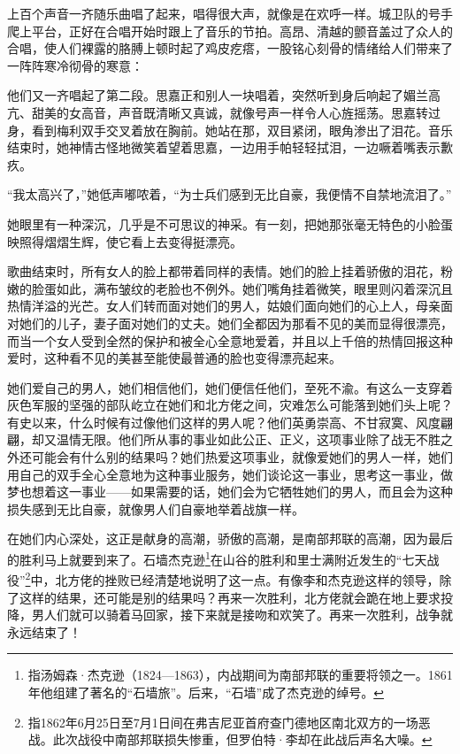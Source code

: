 \par 上百个声音一齐随乐曲唱了起来，唱得很大声，就像是在欢呼一样。城卫队的号手爬上平台，正好在合唱开始时跟上了音乐的节拍。高昂、清越的颤音盖过了众人的合唱，使人们裸露的胳膊上顿时起了鸡皮疙瘩，一股铭心刻骨的情绪给人们带来了一阵阵寒冷彻骨的寒意：
\par 他们又一齐唱起了第二段。思嘉正和别人一块唱着，突然听到身后响起了媚兰高亢、甜美的女高音，声音既清晰又真诚，就像号声一样令人心旌摇荡。思嘉转过身，看到梅利双手交叉着放在胸前。她站在那，双目紧闭，眼角渗出了泪花。音乐结束时，她神情古怪地微笑着望着思嘉，一边用手帕轻轻拭泪，一边噘着嘴表示歉疚。
\par “我太高兴了，”她低声嘟哝着，“为士兵们感到无比自豪，我便情不自禁地流泪了。”
\par 她眼里有一种深沉，几乎是不可思议的神采。有一刻，把她那张毫无特色的小脸蛋映照得熠熠生辉，使它看上去变得挺漂亮。
\par 歌曲结束时，所有女人的脸上都带着同样的表情。她们的脸上挂着骄傲的泪花，粉嫩的脸蛋如此，满布皱纹的老脸也不例外。她们嘴角挂着微笑，眼里则闪着深沉且热情洋溢的光芒。女人们转而面对她们的男人，姑娘们面向她们的心上人，母亲面对她们的儿子，妻子面对她们的丈夫。她们全都因为那看不见的美而显得很漂亮，而当一个女人受到全然的保护和被全心全意地爱着，并且以上千倍的热情回报这种爱时，这种看不见的美甚至能使最普通的脸也变得漂亮起来。
\par 她们爱自己的男人，她们相信他们，她们便信任他们，至死不渝。有这么一支穿着灰色军服的坚强的部队屹立在她们和北方佬之间，灾难怎么可能落到她们头上呢？有史以来，什么时候有过像他们这样的男人呢？他们英勇崇高、不甘寂寞、风度翩翩，却又温情无限。他们所从事的事业如此公正、正义，这项事业除了战无不胜之外还可能会有什么别的结果吗？她们热爱这项事业，就像爱她们的男人一样，她们用自己的双手全心全意地为这种事业服务，她们谈论这一事业，思考这一事业，做梦也想着这一事业——如果需要的话，她们会为它牺牲她们的男人，而且会为这种损失感到无比自豪，就像男人们自豪地举着战旗一样。
\par 在她们内心深处，这正是献身的高潮，骄傲的高潮，是南部邦联的高潮，因为最后的胜利马上就要到来了。石墙杰克逊\footnote{指汤姆森·杰克逊（1824—1863），内战期间为南部邦联的重要将领之一。1861年他组建了著名的“石墙旅”。后来，“石墙”成了杰克逊的绰号。}在山谷的胜利和里士满附近发生的“七天战役”\footnote{指1862年6月25日至7月1日间在弗吉尼亚首府查门德地区南北双方的一场恶战。此次战役中南部邦联损失惨重，但罗伯特·李却在此战后声名大噪。}中，北方佬的挫败已经清楚地说明了这一点。有像李和杰克逊这样的领导，除了这样的结果，还可能是别的结果吗？再来一次胜利，北方佬就会跪在地上要求投降，男人们就可以骑着马回家，接下来就是接吻和欢笑了。再来一次胜利，战争就永远结束了！
